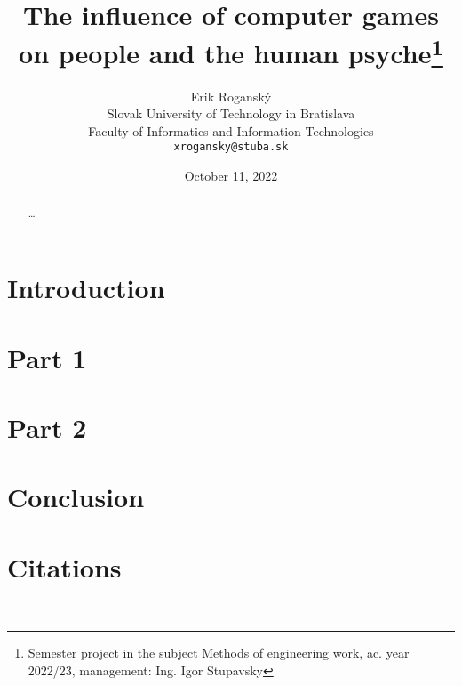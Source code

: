 \documentclass[10pt,twoside,slovak,a4paper]{article}
\title{The influence of computer games on people and the human psyche\thanks{Semester project in the subject Methods of engineering work, ac. year 2022/23, management: Ing. Igor Stupavsky}}
\author{Erik Roganský\\[2pt]
	{\small Slovak University of Technology in Bratislava}\\
	{\small Faculty of Informatics and Information Technologies}\\
	{\small \texttt{xrogansky@stuba.sk}}
	}
\date{\small October 11, 2022}
\begin{document}
\maketitle

\begin{abstract}
\ldots
\end{abstract}



\section{Introduction}



\section{Part 1} \label{part1}



\section{Part 2} \label{part2}



\section{Conclusion} \label{conclusion}

\section{Citations} \label{cit} 
~\cite{school,behavior,education,empathy,problems,poz-neg-sol,language}





\end{document}
